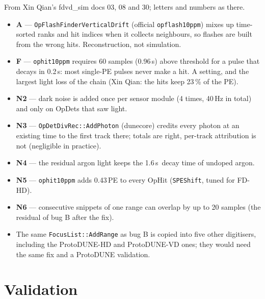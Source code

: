 \documentclass[10pt]{article}
\newcommand{\code}[1]{\texttt{#1}}
\newcommand{\us}{\,\textmu s}
\begin{document}
From Xin Qian's fdvd\_sim docs 03, 08 and 30; letters and numbers as there.
\begin{itemize}
\item \textbf{A} --- \code{OpFlashFinderVerticalDrift} (official \code{opflash10ppm}) mixes up time-sorted ranks and
  hit indices when it collects neighbours, so flashes are built from the wrong hits. Reconstruction, not simulation.
\item \textbf{F} --- \code{ophit10ppm} requires 60 samples (0.96\us) above threshold for a pulse that decays in
  0.2\us: most single-PE pulses never make a hit. A setting, and the largest light loss of the chain (Xin Qian: the
  hits keep 23\,\% of the PE).
\item \textbf{N2} --- dark noise is added once per sensor module (4 times, 40\,Hz in total) and only on OpDets that
  saw light.
\item \textbf{N3} --- \code{OpDetDivRec::AddPhoton} (dunecore) credits every photon at an existing time to the first
  track there; totals are right, per-track attribution is not (negligible in practice).
\item \textbf{N4} --- the residual argon light keeps the 1.6\us\ decay time of undoped argon.
\item \textbf{N5} --- \code{ophit10ppm} adds 0.43\,PE to every OpHit (\code{SPEShift}, tuned for FD-HD).
\item \textbf{N6} --- consecutive snippets of one range can overlap by up to 20 samples (the residual of bug B after
  the fix).
\item The same \code{FocusList::AddRange} as bug B is copied into five other digitisers, including the ProtoDUNE-HD and
  ProtoDUNE-VD ones; they would need the same fix and a ProtoDUNE validation.
\end{itemize}

\section{Validation}
\label{sec:validation}
\end{document}
